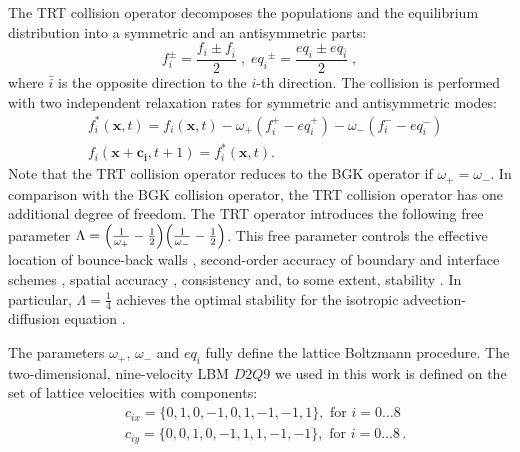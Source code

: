 \documentclass{article}
\newcommand{\beqal}{\begin{equation}\begin{aligned}}
\newcommand{\feqal}{\end{aligned}\end{equation}}
\newcommand{\omegaplus}{\omega_{+}}
\newcommand{\omegaminus}{\omega_{-}}
\begin{document}
The TRT collision operator \cite{ginzburg-boundary-main}
decomposes the populations and the equilibrium
distribution into a symmetric and an antisymmetric parts:
\begin{equation}
\label{trtdecomp}
f^{\pm}_i=\frac{f_i\pm f_{\bar{i}}}{2}\;,\; 
{eq_i}^{\pm}=\frac{eq_i\pm eq_{\bar{i}}}{2}\;,
\end{equation}
where $\bar{i}$ is the opposite direction to the $i$-th direction.
The collision is performed with two independent relaxation rates for 
symmetric and antisymmetric modes:
\begin{equation}
\label{trt}
\begin{aligned}
&f_i^{*}(\bm{x},t)=f_i(\bm{x},t)-\omegaplus (f_i^{+} - eq_i^+)-\omegaminus
(f_i^{-} -
eq_i^-)\\
&f_i(\bm{x}+\bm{c_i},t+1)=f_i^{*}(\bm{x},t).
\end{aligned}
\end{equation}
Note that the TRT collision operator reduces to the BGK operator if
$\omegaplus=\omegaminus$. In comparison with the BGK collision operator,
the TRT collision operator has one additional degree of freedom. The TRT operator 
introduces
the following free parameter
$\Lambda=\Bigl(\frac{1}{\omegaplus}-\frac{1}{2}\Bigr)\Bigl(\frac{1}{\omegaminus}-\frac{1}{2}
\Bigr)$. 
This free parameter controls the effective location of  bounce-back
walls \cite{ginzburg-multireflection}, second-order accuracy of
boundary \cite{ginzburg-boundary-main} and interface schemes \cite{ginzburg-discontinious}, 
spatial accuracy \cite{ginzburg-recurrence,servan-trt-stability},
consistency \cite{ginzburg-brinkman} and, to some extent,
stability \cite{kuzmin-stability-optimal,kuzmin-d1q3,servan-trt-stability}.
In particular, $\Lambda=\frac{1}{4}$ achieves the optimal stability for the
isotropic advection-diffusion equation \cite{kuzmin-stability-optimal}. 

The parameters $\omegaplus$, $\omegaminus$ and $eq_i$ fully define the lattice Boltzmann
procedure. The two-dimensional, nine-velocity LBM $D2Q9$ we used in this work is defined on the set
of lattice
velocities with components:
\beqal
&c_{ix}=\{0,1,0,-1,0,1,-1,-1,1\},\text{ for } i=0\dots8\\
&c_{iy}=\{0,0,1,0,-1,1,1,-1,-1\},\text{ for } i=0\dots8\,.
\feqal
\end{document}
